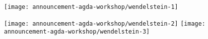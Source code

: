 \documentclass[12pt,utf8,notheorems,compress,t]{beamer}
\begin{document}
\newcommand{\imgslide}[1]{{\usebackgroundtemplate{\parbox[c][\paperheight][c]{\paperwidth}{\centering\texttt{[image: \#1]}}}\begin{frame}[plain]\end{frame}}}

\imgslide{announcement-agda-workshop/catarina-coquand}
\imgslide{announcement-agda-workshop/martin-escardo}
\imgslide{announcement-agda-workshop/pc2018}
\imgslide{announcement-agda-workshop/fischbachau}

\begin{frame}[plain]
  \centering
  \medskip

  \texttt{[image: announcement-agda-workshop/wendelstein-1]}

  \texttt{[image: announcement-agda-workshop/wendelstein-2]}
  \texttt{[image: announcement-agda-workshop/wendelstein-3]}
\end{frame}

\imgslide{announcement-agda-workshop/agda-wiki}
\end{document}

